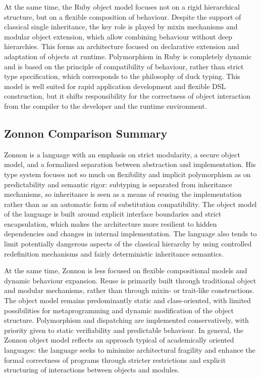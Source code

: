 At the same time, the Ruby object model focuses not on a rigid hierarchical structure, but on a flexible composition of behaviour. Despite the support of classical single inheritance, the key role is played by mixin mechanisms and modular object extension, which allow combining behaviour without deep hierarchies. This forms an architecture focused on declarative extension and adaptation of objects at runtime. Polymorphism in Ruby is completely dynamic and is based on the principle of compatibility of behaviour, rather than strict type specification, which corresponds to the philosophy of duck typing. This model is well suited for rapid application development and flexible DSL construction, but it shifts responsibility for the correctness of object interaction from the compiler to the developer and the runtime environment.

\subsection{Zonnon Comparison Summary}

Zonnon is a language with an emphasis on strict modularity, a secure object model, and a formalized separation between abstraction and implementation. His type system focuses not so much on flexibility and implicit polymorphism as on predictability and semantic rigor: subtyping is separated from inheritance mechanisms, so inheritance is seen as a means of reusing the implementation rather than as an automatic form of substitution compatibility. The object model of the language is built around explicit interface boundaries and strict encapsulation, which makes the architecture more resilient to hidden dependencies and changes in internal implementation. The language also tends to limit potentially dangerous aspects of the classical hierarchy by using controlled redefinition mechanisms and fairly deterministic inheritance semantics.

At the same time, Zonnon is less focused on flexible compositional models and dynamic behaviour expansion. Reuse is primarily built through traditional object and modular mechanisms, rather than through mixin- or trait-like constructions. The object model remains predominantly static and class-oriented, with limited possibilities for metaprogramming and dynamic modification of the object structure. Polymorphism and dispatching are implemented conservatively, with priority given to static verifiability and predictable behaviour. In general, the Zonnon object model reflects an approach typical of academically oriented languages: the language seeks to minimize architectural fragility and enhance the formal correctness of programs through stricter restrictions and explicit structuring of interactions between objects and modules.
